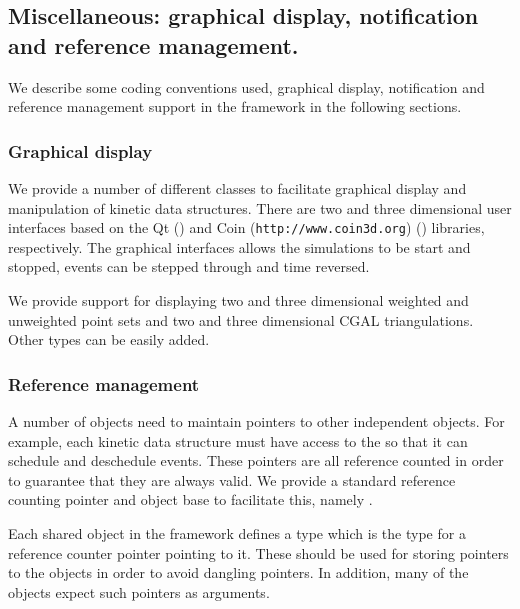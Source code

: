 \subsection{Miscellaneous: graphical display, notification and reference management.}
\label{sec:misc}

We describe some coding conventions used, graphical display,
notification and reference management support in the framework in the
following sections.


\subsubsection{Graphical display}

We provide a number of different classes to facilitate graphical
display and manipulation of kinetic data structures. There are two and
three dimensional user interfaces based on the Qt
() and Coin (\texttt{http://www.coin3d.org})
() libraries,
respectively.  The graphical interfaces allows the simulations to be
start and stopped, events can be stepped through and time reversed.

We provide support for displaying two and three dimensional weighted
and unweighted point sets and two and three dimensional CGAL
triangulations. Other types can be easily added.

\subsubsection{Reference management}

A number of objects need to maintain pointers to other independent
objects. For example, each kinetic data structure must have access to
the  so that it can schedule and deschedule events. These
pointers are all reference counted in order to guarantee that they are
always valid. We provide a standard reference counting pointer and
object base to facilitate this, namely .

Each shared object in the framework defines a type  which is the
type for a reference counter pointer pointing to it. These should be
used for storing pointers to the objects in order to avoid dangling
pointers. In addition, many of the objects expect such pointers as
arguments.

